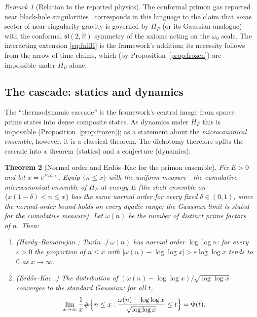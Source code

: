 \documentclass[11pt,a4paper]{article}
\theoremstyle{plain}
\newtheorem{theorem}{Theorem}[section]
\theoremstyle{definition}
\theoremstyle{remark}
\newtheorem{remark}[theorem]{Remark}
\newcommand{\Rr}{\mathbb{R}}
\begin{document}
\begin{remark}[Relation to the reported physics]
The conformal primon gas reported near black-hole singularities~\cite{hartnollyang2026}
corresponds in this language to the claim that \emph{some} sector of
near-singularity gravity is governed by $H_{P}$ (or its Gaussian analogue) with the conformal
$\mathfrak{sl}(2,\Rr)$ symmetry of the axioms acting on the $\omega_{0}$ scale.
The interacting extension \eqref{eq:fullH} is the framework's addition; its necessity
follows from the arrow-of-time claims, which (by
Proposition~\ref{prop:frozen}) are impossible under $H_{P}$ alone.
\end{remark}

\subsection{The cascade: statics and dynamics}

The ``thermodynamic cascade'' is the framework's central image from sparse prime
states into dense composite states. As dynamics under $H_{P}$ this is impossible
(Proposition~\ref{prop:frozen}); as a statement about the \emph{microcanonical ensemble},
however, it is a classical theorem. The dichotomy therefore splits the cascade into a theorem
(statics) and a conjecture (dynamics).

\begin{theorem}[Normal order and Erd\H{o}s--Kac for the primon ensemble]\label{thm:erdoskac}
Fix $E>0$ and let $x=e^{E/\hbar\omega_{0}}$. Equip
$\{n\leq x\}$ with the uniform measure---the \emph{cumulative} microcanonical ensemble of
$H_{P}$ at energy $E$ (the shell ensemble on $\{x(1-\delta)<n\leq x\}$ has the same normal
order for every fixed $\delta\in(0,1)$, since the normal-order bound holds on every dyadic
range; the Gaussian limit is stated for the cumulative measure). Let $\omega(n)$ be the
number of distinct prime factors of $n$. Then:
\begin{enumerate}[leftmargin=1.6em]
\item (Hardy--Ramanujan \cite{hardyramanujan1917}; Tur{\'a}n \cite{turan1934}.)
$\omega(n)$ has normal order $\log\log n$: for every $\varepsilon>0$ the proportion of
$n\leq x$ with $|\omega(n)-\log\log x|>\varepsilon\log\log x$ tends to $0$ as $x\to\infty$.
\item (Erd\H{o}s--Kac \cite{erdoskac1940}.) The distribution of
$(\omega(n)-\log\log x)/\sqrt{\log\log x}$ converges to the standard Gaussian: for all $t$,
\begin{equation}
\lim_{x\to\infty}\frac{1}{x}\#\Bigl\{n\leq x:
\frac{\omega(n)-\log\log x}{\sqrt{\log\log x}}\leq t\Bigr\}=\Phi(t).
\end{equation}
\end{enumerate}
\end{theorem}
\end{document}
